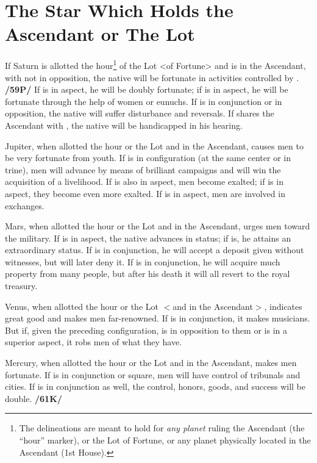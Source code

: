 \section{The Star Which Holds the Ascendant or The Lot}

If Saturn is allotted the hour\footnote{The delineations are meant to hold for \textit{any planet} ruling the Ascendant (the ``hour'' marker), or the Lot of Fortune, or any planet physically located in the Ascendant (1st House).} of the Lot <of Fortune> and is in the Ascendant, with \Mars\xspace not in opposition, the native will be fortunate in activities controlled by \Saturn. \textbf{/59P/} If \Jupiter\xspace is in aspect, he will be doubly fortunate; if \Venus\xspace is in aspect, he will be fortunate through the help of women or eunuchs. If \Mars\xspace is in conjunction or in opposition, the native will suffer disturbance and reversals. If \Mercury\xspace
shares the Ascendant with \Saturn, the native will be handicapped in his hearing.

Jupiter, when allotted the hour or the Lot and in the Ascendant, causes men to be very fortunate from youth. If \Mars\xspace is in configuration (at the same center or in trine), men will advance by means of brilliant campaigns and will win the acquisition of a livelihood. If \Saturn\xspace is also in aspect, men become exalted; if \Venus\xspace is in aspect, they become even more exalted. If \Mercury\xspace is in aspect, men are involved in exchanges.

Mars, when allotted the hour or the Lot and in the Ascendant, urges men toward the military. If \Jupiter\xspace is in aspect, the native advances in status; if \Venus\xspace is, he attains an extraordinary status. If \Mercury\xspace is in conjunction, he will accept a deposit given without witnesses, but will later deny it. If \Jupiter\xspace is in conjunction, he will acquire much property from many people, but after his death it will all revert to the royal treasury.

Venus, when allotted the hour or the Lot $<$and in the Ascendant$>$, indicates great good and makes men far-renowned. If \Mercury\xspace is in conjunction, it makes musicians. But if, given the preceding configuration, \Saturn\xspace is in opposition to them or is in a superior aspect, it robs men of what they have.

Mercury, when allotted the hour or the Lot and in the Ascendant, makes men fortunate. If \Jupiter\xspace is in
conjunction or square, men will have control of tribunals and cities. If \Saturn\xspace is in conjunction as well, the
control, honors, goods, and success will be double. \textbf{/61K/}


